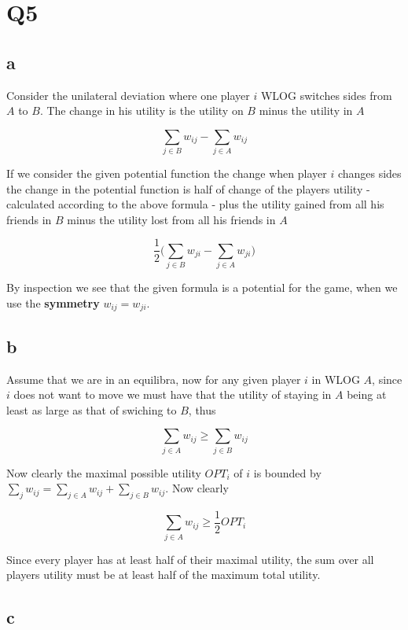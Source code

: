 
\section*{Q5}

\subsection*{a}

Consider the unilateral deviation where one player $i$ WLOG switches sides from $A$ to $B$. The change in his utility is the utility on $B$ minus the utility in $A$

$$
\sum_{j \in B} w_{ij} - \sum_{j \in A} w_{ij}
$$

If we consider the given potential function the change when player $i$ changes sides the change in the potential function is half of change of the players utility - calculated according to the above formula - plus the utility gained from all his friends in $B$ minus the utility lost from all his friends in $A$

$$
\frac{1}{2} \bigg( \sum_{j \in B} w_{ji} - \sum_{j \in A} w_{ji} \bigg)
$$

By inspection we see that the given formula is a potential for the game, when we use the \textbf{symmetry} $w_{ij} = w_{ji}$. 


\subsection*{b}

Assume that we are in an equilibra, now for any given player $i$ in WLOG $A$, since $i$ does not want to move we must have that the utility of staying in $A$ being at least as large as that of swiching to $B$, thus

$$
\sum_{j \in A} w_{ij} \ge \sum_{j \in B} w_{ij}
$$

Now clearly the maximal possible utility $OPT_i$ of $i$ is bounded by $\sum_j w_{ij} = \sum_{j \in A} w_{ij} + \sum_{j \in B} w_{ij}$. Now clearly 

$$
\sum_{j \in A} w_{ij} \ge \frac{1}{2} OPT_i
$$

Since every player has at least half of their maximal utility, the sum over all players utility must be at least half of the maximum total utility.


\subsection*{c}

